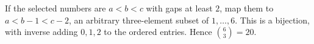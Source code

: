 If the selected numbers are $a<b<c$ with gaps at least $2$, map them to $a<b-1<c-2$, an arbitrary three-element subset of $1,\ldots,6$. This is a bijection, with inverse adding $0,1,2$ to the ordered entries. Hence $\boxed{\binom63=20}$.
